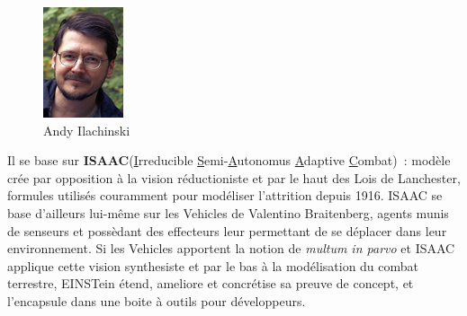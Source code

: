 \documentclass{article}
\begin{document}
\begin{center}
\begin{figure}[H]
\begin{minipage}[H]{0.25\linewidth}
	\includegraphics[width=\textwidth]{../ressources/ilachinski}
	\caption{Andy Ilachinski}
\end{minipage}
\end{figure}
\end{center}

Il se base sur \textbf{ISAAC}(\underline{I}rreducible \underline{S}emi-\underline{A}utonomus \underline{A}daptive \underline{C}ombat)~: modèle crée par opposition à la vision réductioniste et par le haut des Lois de Lanchester, formules utilisés couramment pour modéliser l'attrition depuis 1916. ISAAC se base d'ailleurs lui-même sur les \og{}Vehicles\fg{} de Valentino Braitenberg, agents munis de senseurs et possèdant des effecteurs leur permettant de se déplacer dans leur environnement. Si les Vehicles apportent la notion de \emph{multum in parvo} et ISAAC applique cette vision synthesiste et par le bas à la modélisation du combat terrestre, EINSTein étend, ameliore et concrétise sa preuve de concept, et l'encapsule dans une boite à outils pour développeurs.
\end{document}
